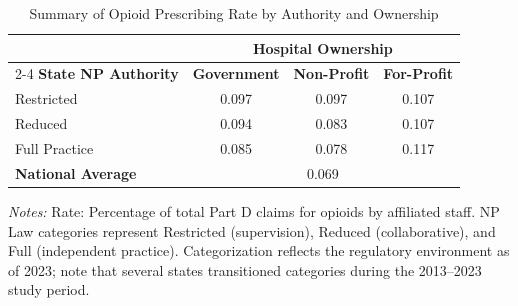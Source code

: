 \begin{table}[htbp]
    \centering
    \caption{Summary of Opioid Prescribing Rate by Authority and Ownership}
    \label{tab:partd_opioid_rate}
    \vspace{0.2cm}
    \begin{tabular}{lccc}
        \toprule
        & \multicolumn{3}{c}{\textbf{Hospital Ownership}} \\
        \cmidrule(lr){2-4}
        \textbf{State NP Authority} & \textbf{Government} & \textbf{Non-Profit} & \textbf{For-Profit} \\
        \midrule
        Restricted & 0.097 & 0.097 & 0.107 \\
        Reduced & 0.094 & 0.083 & 0.107 \\
        Full Practice & 0.085 & 0.078 & 0.117 \\
        \midrule
        \textbf{National Average} & \multicolumn{3}{c}{0.069} \\
        \bottomrule
    \end{tabular}
    \vspace{0.1cm}
    \begin{minipage}{0.85\textwidth}
        \footnotesize \textit{Notes:} Rate: Percentage of total Part D claims for opioids by affiliated staff. NP Law categories represent Restricted (supervision), Reduced (collaborative), and Full (independent practice). Categorization reflects the regulatory environment as of 2023; note that several states transitioned categories during the 2013--2023 study period.
    \end{minipage}
\end{table}